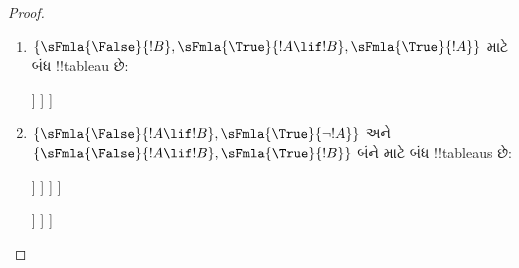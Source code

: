 \documentclass[../../../include/open-logic-section]{subfiles}
\begin{document}
\begin{proof}
  \begin{enumerate}
    \item $\{\sFmla{\False}{!B}, \sFmla{\True}{!A \lif !B},
      \sFmla{\True}{!A}\}$ માટે બંધ !!{tableau} છે:
      \begin{oltableau}
        [\sFmla{\False}{\formula{B}}, just=\TAss
          [\sFmla{\True}{\formula{A} \lif \formula{B}}, just=\TAss
            [\sFmla{\True}{\formula{A}}, just=\TAss
              [\sFmla{\False}{\formula{A}}, just = {\TRule{\True}{\lif}[2]}, close]
              [\sFmla{\True}{\formula{B}}, just = {\TRule{\True}{\lif}[2]}, close]
            ]
          ]
        ]
      \end{oltableau}
    \item $\{\sFmla{\False}{!A \lif !B},
      \sFmla{\True}{\lnot !A}\}$ અને $\{\sFmla{\False}{!A \lif !B},
      \sFmla{\True}{!B}\}$ બંને માટે બંધ !!{tableau}s છે:
      \begin{oltableau}
        [\sFmla{\False}{\formula{A} \lif \formula{B}}, just = \TAss
          [\sFmla{\True}{\lnot \formula{A}}, just = \TAss
            [\sFmla{\True}{\formula{A}}, just = {\TRule{\False}{\lif}[1]}
              [\sFmla{\False}{\formula{B}}, just = {\TRule{\False}{\lif}[1]}
                [\sFmla{\False}{\formula{A}}, just = {\TRule{\True}{\lnot}[2]}, close]
              ]
            ]
          ]
        ]
      \end{oltableau}
      \begin{oltableau}
        [\sFmla{\False}{\formula{A} \lif \formula{B}}, just = \TAss
          [\sFmla{\True}{\formula{B}}, just = \TAss
            [\sFmla{\True}{\formula{A}}, just = {\TRule{\False}{\lif}[1]}
              [\sFmla{\False}{\formula{B}}, just = {\TRule{\False}{\lif}[1]},close
              ]
            ]
          ]
        ]
      \end{oltableau}
  \end{enumerate}
\end{proof}
\end{document}
